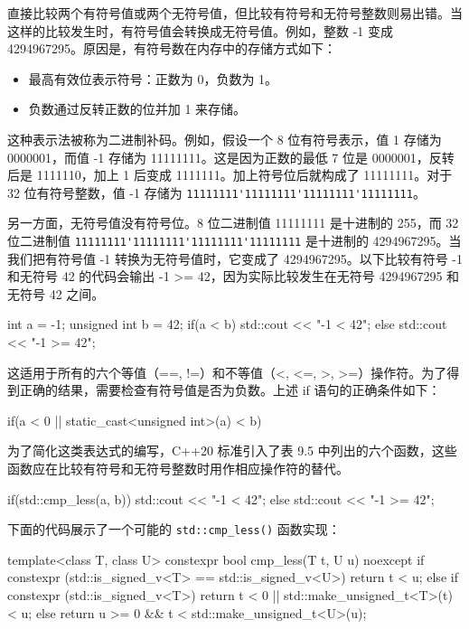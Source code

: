 
直接比较两个有符号值或两个无符号值，但比较有符号和无符号整数则易出错。当这样的比较发生时，有符号值会转换成无符号值。例如，整数 -1 变成 4294967295。原因是，有符号数在内存中的存储方式如下：

\begin{itemize}
\item
最高有效位表示符号：正数为 0，负数为 1。

\item
负数通过反转正数的位并加 1 来存储。
\end{itemize}

这种表示法被称为二进制补码。例如，假设一个 8 位有符号表示，值 1 存储为 0000001，而值 -1 存储为 11111111。这是因为正数的最低 7 位是 0000001，反转后是 1111110，加上 1 后变成 1111111。加上符号位后就构成了 11111111。对于 32 位有符号整数，值 -1 存储为 \verb|11111111'11111111'11111111'11111111|。

另一方面，无符号值没有符号位。8 位二进制值 11111111 是十进制的 255，而 32 位二进制值 \verb|11111111'11111111'11111111'11111111| 是十进制的 4294967295。当我们把有符号值 -1 转换为无符号值时，它变成了 4294967295。以下比较有符号 -1 和无符号 42 的代码会输出 -1 >= 42，因为实际比较发生在无符号 4294967295 和无符号 42 之间。

\begin{cpp}
int a = -1;
unsigned int b = 42;
if(a < b)
{
    std::cout << "-1 < 42\n";
}
else
{
    std::cout << "-1 >= 42\n";
}
\end{cpp}

这适用于所有的六个等值（==, !=）和不等值（<, <=, >, >=）操作符。为了得到正确的结果，需要检查有符号值是否为负数。上述 if 语句的正确条件如下：

\begin{cpp}
if(a < 0 || static_cast<unsigned int>(a) < b)
\end{cpp}

为了简化这类表达式的编写，C++20 标准引入了表 9.5 中列出的六个函数，这些函数应在比较有符号和无符号整数时用作相应操作符的替代。

\begin{cpp}
if(std::cmp_less(a, b))
{
    std::cout << "-1 < 42\n";
}
else
{
    std::cout << "-1 >= 42\n";
}
\end{cpp}

下面的代码展示了一个可能的 \verb|std::cmp_less()| 函数实现：

\begin{cpp}
template<class T, class U>
constexpr bool cmp_less(T t, U u) noexcept
{
    if constexpr (std::is_signed_v<T> == std::is_signed_v<U>)
        return t < u;
    else if constexpr (std::is_signed_v<T>)
        return t < 0 || std::make_unsigned_t<T>(t) < u;
    else
        return u >= 0 && t < std::make_unsigned_t<U>(u);
}
\end{cpp}

